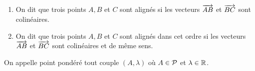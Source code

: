 \begin{defdef}
  \begin{enumerate}
    \item On dit que trois points \(A, B\) et \(C\) sont alignés si les vecteurs 
      \(\vect{AB}\) et \(\vect{BC}\) sont colinéaires.
    \item On dit que trois points \(A, B\) et \(C\) sont alignés dans cet ordre si 
      les vecteurs \(\vect{AB}\) et \(\vect{BC}\) sont colinéaires et de même sens.
  \end{enumerate}
\end{defdef}

\begin{defdef}
  On appelle point pondéré tout couple \((A,\lambda)\) où \(A \in \P\) et $\lambda 
  \in \R$.
\end{defdef}

